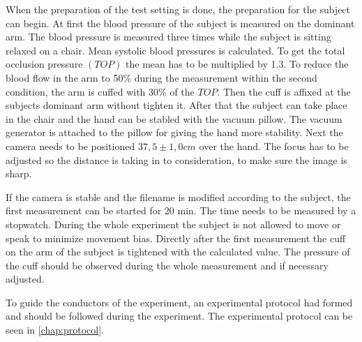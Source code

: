 When the preparation of the test setting is done, the preparation for the subject can begin. At first the blood pressure of the subject is measured on the dominant arm. The blood pressure is measured three times while the subject is sitting relaxed on a chair. Mean systolic blood pressures is calculated. To get the total occlusion pressure $(TOP)$ the mean has to be multiplied by 1.3. To reduce the blood flow in the arm to 50\% during the measurement within the second condition, the arm is cuffed with 30\% of the $TOP$.\cite{mouser2017} 
Then the cuff is affixed at the subjects dominant arm without tighten it. After that the subject can take place in the chair and the hand can be stabled with the vacuum pillow. The vacuum generator is attached to the pillow for giving the hand more stability. Next the camera needs to be positioned $37,5\pm 1,0 cm$ over the hand. The focus has to be adjusted so the distance is taking in to consideration, to make sure the image is sharp.

If the camera is stable and the filename is modified according to the subject, the first measurement can be started for 20 min. The time needs to be measured by a stopwatch. During the whole experiment the subject is not allowed to move or speak to minimize movement bias.
Directly after the first measurement the cuff on the arm of the subject is tightened with the calculated value. The pressure of the cuff should be observed during the whole measurement and if necessary adjusted.

To guide the conductors of the experiment, an experimental protocol had formed and should be followed during the experiment. The experimental protocol can be seen in \cref{chap:protocol}. 

